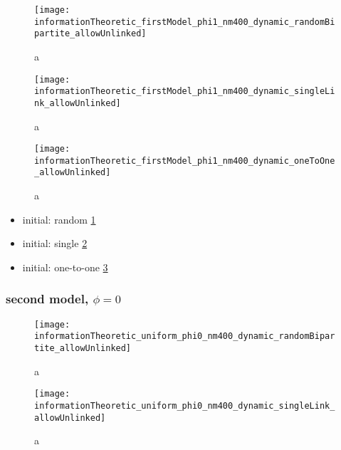 \begin{figure}
  \centering
  \texttt{[image: informationTheoretic\_firstModel\_phi1\_nm400\_dynamic\_randomBipartite\_allowUnlinked]}
  \caption{a}
  \label{fig:informationTheoretic_firstModel_phi1_nm400_dynamic_randomBipartite_allowUnlinked}
\end{figure}

\begin{figure}
  \centering
  \texttt{[image: informationTheoretic\_firstModel\_phi1\_nm400\_dynamic\_singleLink\_allowUnlinked]}
  \caption{a}
  \label{fig:informationTheoretic_firstModel_phi1_nm400_dynamic_singleLink_allowUnlinked}
\end{figure}

\begin{figure}
  \centering
  \texttt{[image: informationTheoretic\_firstModel\_phi1\_nm400\_dynamic\_oneToOne\_allowUnlinked]}
  \caption{a}
  \label{fig:informationTheoretic_firstModel_phi1_nm400_dynamic_oneToOne_allowUnlinked}
\end{figure}

\begin{itemize}
\item initial: random \ref{fig:informationTheoretic_firstModel_phi1_nm400_dynamic_randomBipartite_allowUnlinked}
\item initial: single \ref{fig:informationTheoretic_firstModel_phi1_nm400_dynamic_singleLink_allowUnlinked}
\item initial: one-to-one \ref{fig:informationTheoretic_firstModel_phi1_nm400_dynamic_oneToOne_allowUnlinked}
\end{itemize}

\subsubsection{second model, $\phi=0$}

\begin{figure}
  \centering
  \texttt{[image: informationTheoretic\_uniform\_phi0\_nm400\_dynamic\_randomBipartite\_allowUnlinked]}
  \caption{a}
  \label{fig:informationTheoretic_uniform_phi0_nm400_dynamic_randomBipartite_allowUnlinked}
\end{figure}

\begin{figure}
  \centering
  \texttt{[image: informationTheoretic\_uniform\_phi0\_nm400\_dynamic\_singleLink\_allowUnlinked]}
  \caption{a}
  \label{fig:informationTheoretic_uniform_phi0_nm400_dynamic_singleLink_allowUnlinked}
\end{figure}

